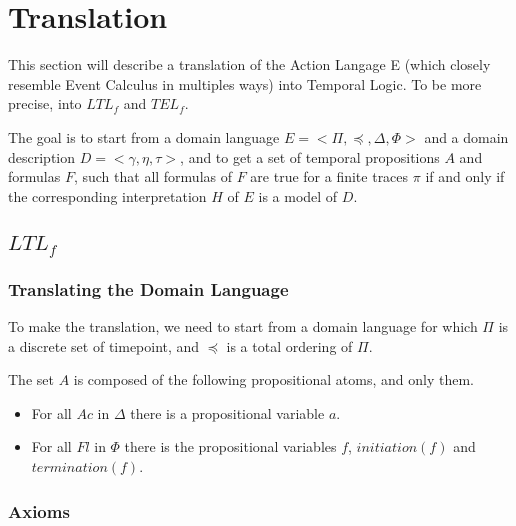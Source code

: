 \section{Translation}\label{sec:translation}

This section will describe a translation of the Action Langage E (which closely resemble Event Calculus in multiples ways) into Temporal Logic.
To be more precise, into $LTL_f$ and $TEL_f$.

The goal is to start from a domain language $E=<\Pi,\preceq,\Delta,\Phi>$ and a domain description $D=<\gamma,\eta,\tau>$, and to get a set of temporal propositions $A$ and formulas $F$, such that all formulas of $F$ are true for a finite traces $\pi$ if and only if the corresponding interpretation $H$ of $E$ is a model of $D$.

\subsection{$LTL_f$}

\subsubsection{Translating the Domain Language}

To make the translation, we need to start from a domain language for which $\Pi$ is a discrete set of timepoint, and $\preceq$ is a total ordering of $\Pi$.

The set $A$ is composed of the following propositional atoms, and only them.

\begin{itemize}
  \item For all $Ac$ in $\Delta$ there is a propositional variable $a$.
  \item For all $Fl$ in $\Phi$ there is the propositional variables $f$, $initiation(f)$ and $termination(f)$.
\end{itemize}

\subsubsection{Axioms}

